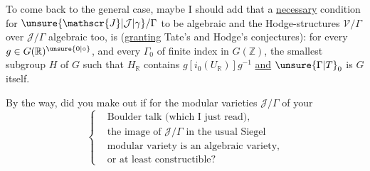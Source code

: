 
To come back to the general case, maybe I should add that a \uline{necessary} condition for $\unsure{\mathscr{J}|\mathcal{J}|\gamma}/\Gamma$ to be algebraic and the Hodge-structures $\mathscr{V}/\Gamma$ over $\mathscr{J}/\Gamma$ algebraic too, is (\uline{granting} Tate's and Hodge's conjectures): for every $g\in G(\mathbb{R})^{\unsure{0|\circ}}$, and every $\Gamma_0$ of finite index in $G(\mathbb{Z})$, the smallest  subgroup $H$ of $G$ such that $H_{\mathbb{R}}$ contains $g[i_0(U_{\mathbb{R}})]g^{-1}$ \uline{and} $\unsure{\Gamma|T}_0$ is $G$ itself.



By the way, did you make out if for the modular varieties $\mathscr{J}/\Gamma$ of your
\[
\left\{\begin{aligned}
&\text{Boulder talk (which I just read),}\\
&\text{the image of }\mathscr{J}/\Gamma\text{ in the usual Siegel}\\
&\text{modular variety is an algebraic variety,}\\
&\text{or at least constructible?}
\end{aligned}\right.
\]

